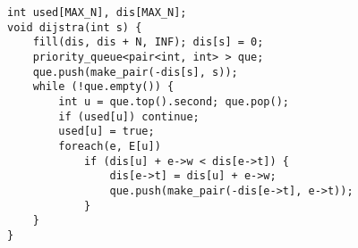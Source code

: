 \begin{lstlisting}
int used[MAX_N], dis[MAX_N];
void dijstra(int s) {
	fill(dis, dis + N, INF); dis[s] = 0;
	priority_queue<pair<int, int> > que;
	que.push(make_pair(-dis[s], s));
	while (!que.empty()) {
		int u = que.top().second; que.pop();
		if (used[u]) continue;
		used[u] = true;
		foreach(e, E[u])
			if (dis[u] + e->w < dis[e->t]) {
				dis[e->t] = dis[u] + e->w;
				que.push(make_pair(-dis[e->t], e->t));
			}
	}
}
\end{lstlisting}
